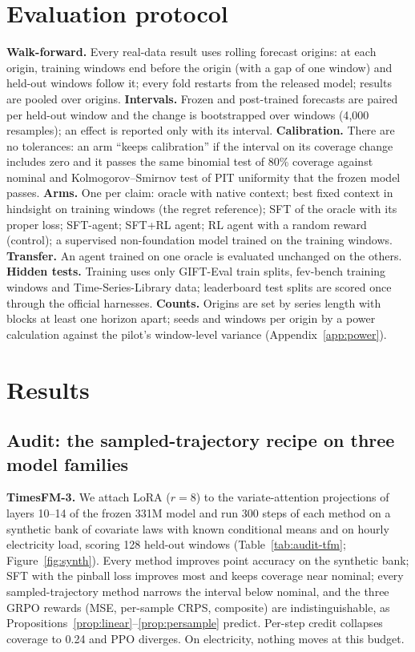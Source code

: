 \documentclass{article}
\begin{document}
\section{Evaluation protocol}
\label{sec:protocol}
\textbf{Walk-forward.} Every real-data result uses rolling forecast origins: at each origin, training windows end before the origin (with a gap of one window) and held-out windows follow it; every fold restarts from the released model; results are pooled over origins. \textbf{Intervals.} Frozen and post-trained forecasts are paired per held-out window and the change is bootstrapped over windows (4{,}000 resamples); an effect is reported only with its interval. \textbf{Calibration.} There are no tolerances: an arm ``keeps calibration'' if the interval on its coverage change includes zero and it passes the same binomial test of 80\% coverage against nominal and Kolmogorov--Smirnov test of PIT uniformity that the frozen model passes. \textbf{Arms.} One per claim: oracle with native context; best fixed context in hindsight on training windows (the regret reference); SFT of the oracle with its proper loss; SFT-agent; SFT+RL agent; RL agent with a random reward (control); a supervised non-foundation model trained on the training windows. \textbf{Transfer.} An agent trained on one oracle is evaluated unchanged on the others. \textbf{Hidden tests.} Training uses only GIFT-Eval train splits, fev-bench training windows and Time-Series-Library data; leaderboard test splits are scored once through the official harnesses. \textbf{Counts.} Origins are set by series length with blocks at least one horizon apart; seeds and windows per origin by a power calculation against the pilot's window-level variance (Appendix~\ref{app:power}).

\section{Results}
\subsection{Audit: the sampled-trajectory recipe on three model families}
\label{sec:audit}
\textbf{TimesFM-3.} We attach LoRA ($r{=}8$) to the variate-attention projections of layers 10--14 of the frozen 331M model and run 300 steps of each method on a synthetic bank of covariate laws with known conditional means and on hourly electricity load, scoring 128 held-out windows (Table~\ref{tab:audit-tfm}; Figure~\ref{fig:synth}). Every method improves point accuracy on the synthetic bank; SFT with the pinball loss improves most and keeps coverage near nominal; every sampled-trajectory method narrows the interval below nominal, and the three GRPO rewards (MSE, per-sample CRPS, composite) are indistinguishable, as Propositions~\ref{prop:linear}--\ref{prop:persample} predict. Per-step credit collapses coverage to 0.24 and PPO diverges. On electricity, nothing moves at this budget.
\end{document}
